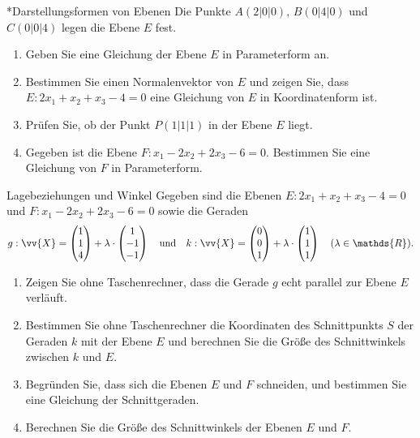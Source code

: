 \begin{uebung}*{Darstellungsformen von Ebenen}
Die Punkte $A(2|0|0)$, $B(0|4|0)$ und $C(0|0|4)$ legen die Ebene $E$ fest.
\begin{enumerate}[label=\alph*)]
  \item Geben Sie eine Gleichung der Ebene $E$ in Parameterform an.
  \item Bestimmen Sie einen Normalenvektor von $E$ und zeigen Sie, dass $E: 2x_1+x_2+x_3-4=0$ eine Gleichung von $E$ in Koordinatenform ist.
  \item Prüfen Sie, ob der Punkt $P(1|1|1)$ in der Ebene $E$ liegt.
  \item Gegeben ist die Ebene $F: x_1-2x_2+2x_3-6=0$. Bestimmen Sie eine Gleichung von $F$ in Parameterform.
\end{enumerate}
\end{uebung}

\begin{uebung}{Lagebeziehungen und Winkel}
Gegeben sind die Ebenen $E: 2x_1+x_2+x_3-4=0$ und $F: x_1-2x_2+2x_3-6=0$ sowie die Geraden
\[g: \vv{X} = \begin{pmatrix} 1\\ 1\\ 4\end{pmatrix} + \lambda\cdot\begin{pmatrix} 1\\ -1\\ -1\end{pmatrix}\quad\text{und}\quad
k: \vv{X} = \begin{pmatrix} 0\\ 0\\ 1\end{pmatrix} + \lambda\cdot\begin{pmatrix} 1\\ 1\\ 1\end{pmatrix}\quad(\lambda\in\mathds{R}).\]
\begin{enumerate}[label=\alph*)]
  \item Zeigen Sie ohne Taschenrechner, dass die Gerade $g$ echt parallel zur Ebene $E$ verläuft.
  \item Bestimmen Sie ohne Taschenrechner die Koordinaten des Schnittpunkts $S$ der Geraden $k$ mit der Ebene $E$ und berechnen Sie die Größe des Schnittwinkels zwischen $k$ und $E$.
  \item Begründen Sie, dass sich die Ebenen $E$ und $F$ schneiden, und bestimmen Sie eine Gleichung der Schnittgeraden.
  \item Berechnen Sie die Größe des Schnittwinkels der Ebenen $E$ und $F$.
\end{enumerate}
\end{uebung}

